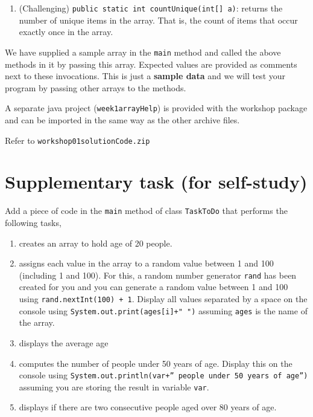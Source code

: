 \begin{questions}
\begin{enumerate}
\item (Challenging) \texttt{public static int countUnique(int[] a)}: returns the number of unique items in the array. That is, the count of items that occur exactly once in the array.
\end{enumerate}

We have supplied a sample array in the \texttt{main} method and called the above methods in it by passing this array. Expected values are provided as comments next to these invocations. This is just a \textbf{sample data} and we will test your program by passing other arrays to the methods.

A separate java project (\texttt{week1arrayHelp}) is provided with the workshop package and can be imported in the same way as the other archive files.

\begin{solution}
Refer to \texttt{workshop01solutionCode.zip}	
\end{solution}

\newpage
\section*{Supplementary task (for self-study)}

\question Add a piece of code in the \texttt{main} method of class \texttt{TaskToDo}  that performs the following tasks,

\begin{enumerate}
\item creates an array to hold age of 20 people. 

\item assigns each value in the array to a random value between 1 and 100 (including 1 and 100). For this, a random number generator \texttt{rand} has been created for you and you can generate a random value between 1 and 100 using \texttt{rand.nextInt(100) + 1}. Display all values separated by a space on the console using \texttt{System.out.print(ages[i]+" ")} assuming \texttt{ages} is the name of the array.

\item displays the average age

\item computes the number of people under 50 years of age. Display this on the console using \texttt{System.out.println(var+'' people under 50 years of age'')} assuming you are storing the result in variable \texttt{var}. 

\item displays if there are two consecutive people aged over 80 years of age.


\end{enumerate}
\end{questions}
